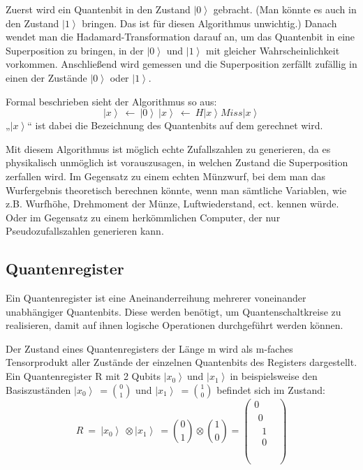 Zuerst wird ein Quantenbit in den Zustand $\left|0\right\rangle$ gebracht. (Man könnte es auch in den Zustand $\left|1\right\rangle$ bringen. Das ist für diesen Algorithmus unwichtig.) Danach wendet man die Hadamard-Transformation darauf an, um das Quantenbit in eine Superposition zu bringen, in der $\left|0\right\rangle$ und $\left|1\right\rangle$ mit gleicher Wahrscheinlichkeit vorkommen. Anschließend wird gemessen und die Superposition zerfällt zufällig in einen der Zustände $\left|0\right\rangle$ oder $\left|1\right\rangle$.

Formal beschrieben sieht der Algorithmus so aus:
	$$\left|\left.x\right\rangle\right.\ \gets\ \left|\left.0\right\rangle\right.\ 
	\left|\left.x\right\rangle\right.\ \gets\ H\left|\left.x\right\rangle\right.
	Miss\left|\left.x\right\rangle\right.$$
„$\left|x\right\rangle$“ ist dabei die Bezeichnung des Quantenbits auf dem gerechnet wird.

Mit diesem Algorithmus ist möglich echte Zufallszahlen zu generieren, da es physikalisch unmöglich ist vorauszusagen, in welchen Zustand die Superposition zerfallen wird. Im Gegensatz zu einem echten Münzwurf, bei dem man das Wurfergebnis theoretisch berechnen könnte, wenn man sämtliche Variablen, wie z.B. Wurfhöhe, Drehmoment der Münze, Luftwiederstand, ect. kennen würde. Oder im Gegensatz zu einem herkömmlichen Computer, der nur Pseudozufallszahlen generieren kann. 
\subsection{Quantenregister}

Ein Quantenregister ist eine Aneinanderreihung mehrerer voneinander unabhängiger Quantenbits. Diese werden benötigt, um Quantenschaltkreise zu realisieren, damit auf ihnen logische Operationen durchgeführt werden können. 

Der Zustand eines Quantenregisters der Länge m wird als m-faches Tensorprodukt aller Zustände der einzelnen Quantenbits des Registers dargestellt. Ein Quantenregister R mit 2 Qubits $\left|\left.x_0\right\rangle\ \right.$und $\left|\left.x_1\right\rangle\ \right.$in beispielsweise den Basiszuständen $\left|\left.x_0\right\rangle\ \right.=\binom{0}{1}$ und $\left|\left.x_1\right\rangle\ \right.=\binom{1}{0}$ befindet sich im Zustand:
$$R\ =\ \left|\left.x_0\right\rangle\ \right.\otimes\left|\left.x_1\right\rangle\ \right.=\binom{0}{1}\otimes\binom{1}{0}=\left(\begin{matrix}0\\\begin{matrix}0\\\begin{matrix}1\\0\\\end{matrix}\\\end{matrix}\\\end{matrix}\right)$$

